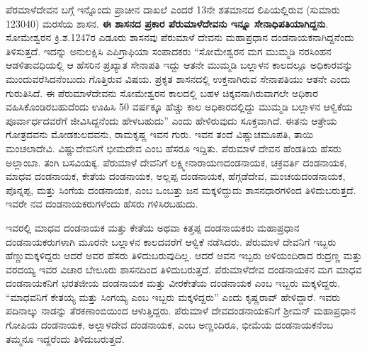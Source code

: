 ಪೆರಮಾಳೆದೇವನ ಬಗ್ಗೆ ಇನ್ನೊಂದು ಪ್ರಾಚೀನ ದಾಖಲೆ ಎಂದರೆ 13ನೇ ಶತಮಾನದ ಲಿಪಿಯಲ್ಲಿರುವ (ಸುಮಾರು 1230\enginline{-}40) ಮರಸೆಯ ಶಾಸನ. \textbf{ಈ ಶಾಸನದ ಪ್ರಕಾರ ಪೆರುಮಾಳೆದೇವನು ಇನ್ನೂ ಸೇನಾಧಿಪತಿಯಾಗಿದ್ದನು}. ಸೋಮೇಶ್ವರನ ಕ್ರಿ.ಶ.1247ರ ಎಡೂರು ಶಾಸನವು ಪೆರುಮಾಳೆ ದೇವನು ಮಹಾಪ್ರಧಾನ ದಂಡನಾಯಕನಾಗಿದ್ದನೆಂದು ತಿಳಿಸುತ್ತದೆ. ಇದನ್ನು ಅನುಲಕ್ಷಿಸಿ ಎಪಿಗ್ರಾಫಿಯಾ ಸಂಪಾದಕರು “ಸೋಮೇಶ್ವರನ ಮಗ ಮುಮ್ಮಡಿ ನರಸಿಂಹನ ಆಡಳಿತಾವಧಿಯಲ್ಲಿ ಆ ಹೆಸರಿನ ಪ್ರಖ್ಯಾತ ಸೇನಾಪತಿ ಇದ್ದು ಆತನೇ ಮುಮ್ಮಡಿ ಬಲ್ಲಾಳನ ಕಾಲದಲ್ಲೂ ಅಧಿಕಾರವನ್ನು ಮುಂದುವರೆಸಿದನೆಂಬುದು ಗೊತ್ತಿರುವ ವಿಷಯ. ಪ್ರಕೃತ ಶಾಸನದಲ್ಲಿ ಉಕ್ತನಾಗಿರುವ ಸೇನಾಪತಿಯು ಆತನೇ ಎಂದು ಗುರುತಿಸಿದೆ. ಈ ಪೆರುಮಾಳೆದೇವನು ಸೋಮೇಶ್ವರನ ಕಾಲದಲ್ಲಿ ಬಹಳ ಚಿಕ್ಕವನಾಗಿರುವಾಗಲೇ ಅಧಿಕಾರ ವಹಿಸಿಕೊಂಡಿರಬಹುದೆಂದು ಊಹಿಸಿ 50 ವರ್ಷಕ್ಕೂ ಹೆಚ್ಚು ಕಾಲ ಅಧಿಕಾರದಲ್ಲಿದ್ದು ಮುಮ್ಮಡಿ ಬಲ್ಲಾಳನ ಆಳ್ವಿಕೆಯ ಪೂರ್ವಾರ್ಧದವರೆಗೆ ಜೀವಿಸಿದ್ದನೆಂದು ಹೇಳಬಹುದು” ಎಂದು ಹೇಳಿರುವುದು ಸೂಕ್ತವಾಗಿದೆ. ಈತನು ಆತ್ರೇಯ ಗೋತ್ರದವನು ಮೋಡಕುಲದವನು, ರಾಮಕೃಷ್ಣ ಇವನ ಗುರು. ಇವನ ತಂದೆ ವಿಷ್ಣುಚಮೂಪತಿ, ತಾಯಿ ಮಂಚಲಾದೇವಿ. ವಿಷ್ಣುದೇವನಿಗೆ ಭೀಮದೇವ ಎಂಬ ಹೆಸರೂ ಇದ್ದಿತು. ಪೆರುಮಾಳೆ ದೇವನ ಹೆಂಡತಿಯ ಹೆಸರು ಅಲ್ಲಾಂಬಾ. ತಂಗಿ ಬಸವಿಯಕ್ಕ. ಪೆರುಮಾಳೆ ದೇವನಿಗೆ ಲಕ್ಷ್ಮೀನಾರಾಯಣದಂಡನಾಯಕ, ಚಕ್ರವರ್ತಿ ದಂಡನಾಯಕ, ಮಾಧವ ದಂಡನಾಯಕ, ಕೇತೆಯ ದಂಡನಾಯಕ, ಅಲ್ಲಪ್ಪ ದಂಡನಾಯಕ, ಹೆಗ್ಗಡೆದೇವ, ಮಂಚಯದಂಡನಾಯಕ, ಪೊನ್ನಪ್ಪ, ಮತ್ತು ಸಿಂಗೆಯ ದಂಡನಾಯಕ, ಎಂಬ ಒಂಬತ್ತು ಜನ ಮಕ್ಕಳಿದ್ದುದು ಶಾಸನಧಾರಗಳಿಂದ ತಿಳಿದುಬರುತ್ತದೆ. ಇವರೇ ನವ ದಂಡನಾಯಕರುಗಳೆಂದು ಹೆಸರು ಗಳಿಸಿರಬಹುದು.

ಇವರಲ್ಲಿ ಮಾಧವ ದಂಡನಾಯಕ ಮತ್ತು ಕೇತೆಯ ಅಥವಾ ಕಿತ್ತಪ್ಪ ದಂಡನಾಯಕರು ಮಹಾಪ್ರಧಾನ ದಂಡನಾಯಕರು\-ಗಳಾಗಿ ಮೂರನೇ ಬಲ್ಲಾಳನ ಕಾಲದವರೆಗೆ ಆಳ್ವಿಕೆ ನಡೆಸಿದರು. ಪೆರುಮಾಳೆ ದೇವನಿಗೆ ಇಬ್ಬರು ಹೆಣ್ಣುಮಕ್ಕಳಿದ್ದರು ಆದರೆ ಅವರ ಹೆಸರು ತಿಳಿದುಬರುವುದಿಲ್ಲ. ಆದರೆ ಅವನ ಇಬ್ಬರು ಅಳಿಯಂದಿರಾದ ರುದ್ರಣ್ಣ ಮತ್ತು ವರದಯ್ಯ ಇವರ ವಿಚಾರ ಬೇಲೂರು ಶಾಸನದಿಂದ ತಿಳಿದುಬರುತ್ತದೆ. ಪೆರುಮಾಳೆದೇವ ದಂಡನಾಯಕನ ಮಗ ಮಾಧವ ದಂಡನಾಯಕನಿಗೆ ಭರತಜೀಯ ದಂಡನಾಯಕ ಮತ್ತು ವೀರಕೇತೆಯ ದಂಡನಾಯಕ ಎಂಬ ಇಬ್ಬರು ಮಕ್ಕಳಿದ್ದರು. “ಮಾಧವನಿಗೆ ಕೇತಯ್ಯ ಮತ್ತು ಸಿಂಗಯ್ಯ ಎಂಬ ಇಬ್ಬರು ಮಕ್ಕಳಿದ್ದರು” ಎಂದು ಕೃಷ್ಣರಾವ್​ ಹೇಳಿದ್ದಾರೆ. ಇವರು ಪದಿನಾಲ್ಕು ನಾಡನ್ನು ತೆರಕಣಾಂಬಿಯಿಂದ ಆಳುತ್ತಿದ್ದರು. ಪೆರುಮಾಳೆ ದೇವದಂಡನಾಯಕನಿಗೆ ಶ‍್ರೀಮನ್​ ಮಹಾಪ್ರಧಾನ ಗೋಪಿಯ ದಂಡನಾಯಕ, ಅಲ್ಲಾಳದೇವ ದಂಡನಾಯಕ, ಎಂಬ ಅಣ್ಣಂದಿರೂ, ಭೀಮೆಯ ದಂಡನಾಯಕನೆಂಬ ತಮ್ಮನೂ ಇದ್ದರೆಂದು ತಿಳಿದುಬರುತ್ತದೆ.

